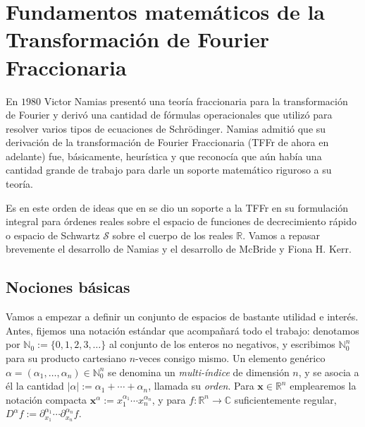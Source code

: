 \chapter{Fundamentos matemáticos de la Transformación de Fourier Fraccionaria}
\thispagestyle{fancy}
\fancyhead[L]{\leftmark}
 
    En $1980$ Victor Namias \citep{namias1980fractional} presentó una teoría fraccionaria para la transformación de Fourier y derivó una cantidad de fórmulas operacionales que utilizó para resolver varios tipos de ecuaciones de Schrödinger. Namias admitió que su derivación de la transformación de Fourier Fraccionaria (TFFr de ahora en adelante) fue, básicamente, heurística y que reconocía que aún había una cantidad grande de trabajo para darle un soporte matemático riguroso a su teoría.

    Es en este orden de ideas que en \citep{mcbride1987namias,kerr1988distributional} se dio un soporte a la TFFr en su formulación integral para órdenes reales sobre el espacio de funciones de decrecimiento rápido o espacio de Schwartz $\mathcal{S}$ sobre el cuerpo de los reales $\mathbb{R}$. Vamos a repasar brevemente el desarrollo de Namias y el desarrollo de McBride y Fiona H. Kerr. 

    \section{Nociones básicas}

        Vamos a empezar a definir un conjunto de espacios de bastante utilidad e interés. Antes, fijemos una notación estándar que acompañará todo el trabajo: denotamos por $\mathbb{N}_0 := \{0,1,2,3,\ldots\}$ al conjunto de los enteros no negativos, y escribimos $\mathbb{N}_0^n$ para su producto cartesiano $n$-veces consigo mismo. Un elemento genérico $\alpha = (\alpha_1,\ldots,\alpha_n)\in \mathbb{N}_0^n$ se denomina un \textit{multi-índice} de dimensión $n$, y se asocia a él la cantidad $|\alpha| := \alpha_1+\cdots+\alpha_n$, llamada su \textit{orden}. Para $\mathbf{x}\in\mathbb{R}^n$ emplearemos la notación compacta $\mathbf{x}^\alpha := x_1^{\alpha_1}\cdots x_n^{\alpha_n}$, y para $f:\mathbb{R}^n\to \mathbb{C}$ suficientemente regular, $D^\alpha f := \partial_{x_1}^{\alpha_1}\cdots \partial_{x_n}^{\alpha_n} f$.

